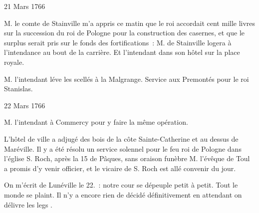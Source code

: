                      \begin{diary}{21 Mars 1766}{}
                        
                        
                           M. le comte de Stainville m'a appris ce
                           matin que le roi
                           accordait cent
                              mille livres
                           sur la succession du roi de Pologne pour la
                           construction des
                              casernes, et que le surplus
                           serait pris sur le fonds des fortifications :
                           M. de Stainville logera à
                              l'intendance
                           au bout de la carrière. Et l'intendant dans
                           son hôtel sur la place
                              royale. \bigskip
        
        
                        
                           M. l'intendant léve les scellés à
                              la
                              Malgrange. Service aux Premontés pour
                           le roi Stanislas. \bigskip
        
        
                     \end{diary}

                     \begin{diary}{22 Mars 1766}{}
                        
                        
                           M. l'intendant à Commercy pour y
                           faire la même opération. \bigskip
        
        
                        
                           L'hôtel de ville a adjugé
                           des bois de la
                              côte Sainte-Catherine et au dessus de Maréville.
                           Il y a été résolu un service solennel
                           pour le feu roi de Pologne dans l’église S.
                              Roch,
                           après la 15 de Pâques, sans oraison
                           funèbre
                           M. l'évêque de Toul a promis
                           d'y venir officier,
                           et le vicaire de S. Roch
                           est allé convenir du jour. \bigskip
        
        
                         On m'écrit de Lunéville
                           le 22. : \og notre cour
                              se dépeuple petit à petit. Tout le monde se
                              plaint. Il n'y a encore rien de décidé
                              définitivement en attendant on délivre les legs \fg{}. \bigskip
        
        
                     \end{diary}
                     
